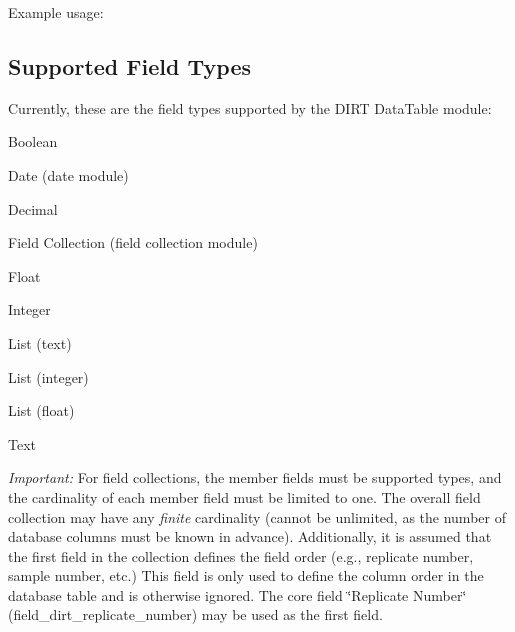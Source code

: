Example usage\+:




\subsection*{Supported Field Types}

Currently, these are the field types supported by the D\+I\+RT Data\+Table module\+:


\begin{DoxyItemize}
\item Boolean
\item Date (date module)
\item Decimal
\item Field Collection (field collection module)
\item Float
\item Integer
\item List (text)
\item List (integer)
\item List (float)
\item Text
\end{DoxyItemize}

{\itshape Important\+:} For field collections, the member fields must be supported types, and the cardinality of each member field must be limited to one. The overall field collection may have any {\itshape finite} cardinality (cannot be unlimited, as the number of database columns must be known in advance). Additionally, it is assumed that the first field in the collection defines the field order (e.\+g., replicate number, sample number, etc.) This field is only used to define the column order in the database table and is otherwise ignored. The core field \char`\"{}\+Replicate Number\char`\"{} (field\+\_\+dirt\+\_\+replicate\+\_\+number) may be used as the first field. 